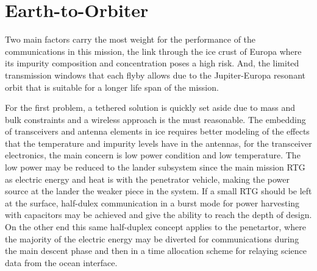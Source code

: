 


\section{Earth-to-Orbiter}







	



Two main factors carry the most weight for the performance of the communications in this mission, the link through the ice crust of Europa where its impurity composition and concentration poses a high risk. And, the limited transmission windows that each flyby allows due to the Jupiter-Europa resonant orbit that is suitable for a longer life span of the mission.

For the first problem, a tethered solution is quickly set aside due to mass and bulk constraints and a wireless approach is the must reasonable. The embedding of transceivers and antenna elements in ice requires better modeling of the effects that the temperature and impurity levels have in the antennas, for the transceiver electronics, the main concern is low power condition and low temperature. The low power may be reduced to the lander subsystem since the main mission RTG as electric energy and heat is with the penetrator vehicle, making the power source at the lander the weaker piece in the system. If a small RTG should be left at the surface, half-dulex communication in a burst mode for power harvesting with capacitors may be achieved and give the ability to reach the depth of design. On the other end this same half-duplex concept applies to the penetartor, where the majority of the electric energy may be diverted for communications during the main descent phase and then in a time allocation scheme for relaying science data from the ocean interface.

